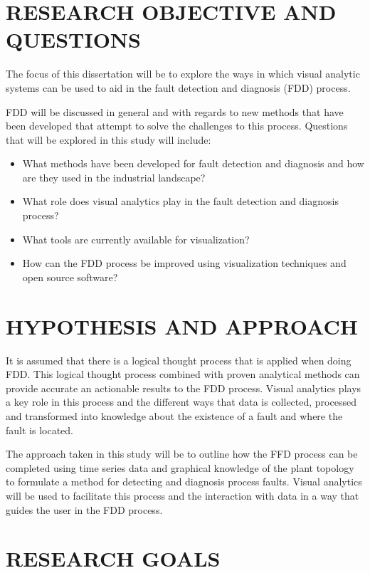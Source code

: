 \section{RESEARCH OBJECTIVE AND QUESTIONS}

The focus of this dissertation will be to explore the ways in which visual analytic systems can be used to aid in the fault detection and diagnosis (FDD) process. \par
FDD will be discussed in general and with regards to new methods that have been developed that attempt to solve the challenges to this process.
Questions that will be explored in this study will include:
\begin{itemize}
\item What methods have been developed for fault detection and diagnosis and how are they used in the industrial landscape?
\item What role does visual analytics play in the fault detection and diagnosis process?
\item What tools are currently available for visualization?
\item How can the FDD process be improved using visualization techniques and open source software?
\end{itemize}

\section{HYPOTHESIS AND APPROACH}

It is assumed that there is a logical thought process that is applied when doing FDD. This logical thought process combined with proven analytical methods can provide accurate an actionable results to the FDD process. Visual analytics plays a key role in this process and the different ways that data is collected, processed and transformed into knowledge about the existence of a fault and where the fault is located.\par
The approach taken in this study will be to outline how the FFD process can be completed using time series data and graphical knowledge of the plant topology to formulate a method for detecting and diagnosis process faults. Visual analytics will be used to facilitate this process and the interaction with data in a way that guides the user in the FDD process.\par

\section{RESEARCH GOALS}

